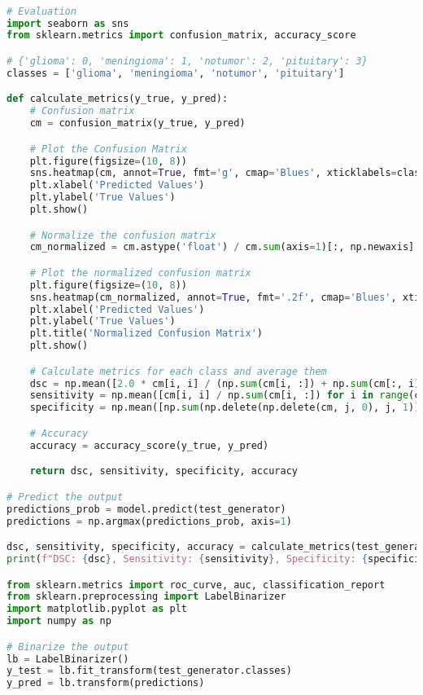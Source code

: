 \begin{lstlisting}[language=Python]

# Evaluation
import seaborn as sns
from sklearn.metrics import confusion_matrix, accuracy_score

# {'glioma': 0, 'meningioma': 1, 'notumor': 2, 'pituitary': 3}
classes = ['glioma', 'meningioma', 'notumor', 'pituitary']

def calculate_metrics(y_true, y_pred):
    # Confusion matrix
    cm = confusion_matrix(y_true, y_pred)

    # Plot the Confusion Matrix
    plt.figure(figsize=(10, 8))
    sns.heatmap(cm, annot=True, fmt='g', cmap='Blues', xticklabels=classes, yticklabels=classes)
    plt.xlabel('Predicted Values')
    plt.ylabel('True Values')
    plt.show()

    # Normalize the confusion matrix
    cm_normalized = cm.astype('float') / cm.sum(axis=1)[:, np.newaxis]

    # Plot the normalized confusion matrix
    plt.figure(figsize=(10, 8))
    sns.heatmap(cm_normalized, annot=True, fmt='.2f', cmap='Blues', xticklabels=classes, yticklabels=classes)
    plt.xlabel('Predicted Values')
    plt.ylabel('True Values')
    plt.title('Normalized Confusion Matrix')
    plt.show()

    # Calculate metrics for each class and average them
    dsc = np.mean([2.0 * cm[i, i] / (np.sum(cm[i, :]) + np.sum(cm[:, i])) for i in range(cm.shape[0])])
    sensitivity = np.mean([cm[i, i] / np.sum(cm[i, :]) for i in range(cm.shape[0])])
    specificity = np.mean([np.sum(np.delete(np.delete(cm, j, 0), j, 1)) / np.sum(np.delete(cm, j, 0)) for j in range(cm.shape[0])])

    # Accuracy
    accuracy = accuracy_score(y_true, y_pred)

    return dsc, sensitivity, specificity, accuracy

# Predict the output
predictions_prob = model.predict(test_generator)
predictions = np.argmax(predictions_prob, axis=1)

dsc, sensitivity, specificity, accuracy = calculate_metrics(test_generator.classes, predictions)
print(f"DSC: {dsc}, Sensitivity: {sensitivity}, Specificity: {specificity}, Accuracy: {accuracy}")

from sklearn.metrics import roc_curve, auc, classification_report
from sklearn.preprocessing import LabelBinarizer
import matplotlib.pyplot as plt
import numpy as np

# Binarize the output
lb = LabelBinarizer()
y_test = lb.fit_transform(test_generator.classes)
y_pred = lb.transform(predictions)


\end{lstlisting}
